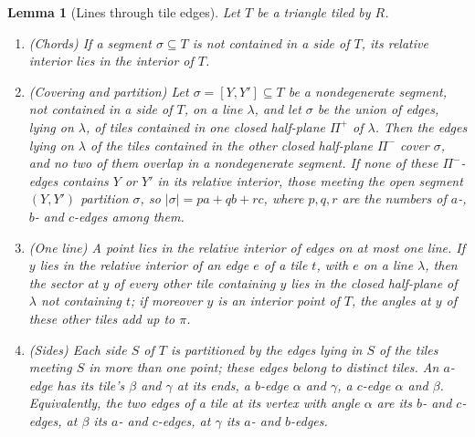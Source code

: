 \documentclass[11pt]{amsart}
\newtheorem{lemma}[theorem]{Lemma}
\theoremstyle{remark}
\begin{document}
\begin{lemma}[Lines through tile edges]\label{app:lines}
Let $T$ be a triangle tiled by $R$.
\begin{enumerate}
\item[(F0)] \textup{(Chords)} If a segment $\sigma\subseteq T$ is not contained in a side of $T$, its relative interior lies in the interior of $T$.
\item[(F1)] \textup{(Covering and partition)} Let $\sigma=[Y,Y']\subseteq T$ be a nondegenerate segment, not contained in a side of $T$, on a line $\lambda$, and let $\sigma$ be the union of edges, lying on $\lambda$, of tiles contained in one closed half-plane $\Pi^+$ of $\lambda$. Then the edges lying on $\lambda$ of the tiles contained in the other closed half-plane $\Pi^-$ cover $\sigma$, and no two of them overlap in a nondegenerate segment. If none of these $\Pi^-$-edges contains $Y$ or $Y'$ in its relative interior, those meeting the open segment $(Y,Y')$ partition $\sigma$, so $|\sigma|=pa+qb+rc$, where $p,q,r$ are the numbers of $a$-, $b$- and $c$-edges among them.
\item[(F2)] \textup{(One line)} A point lies in the relative interior of edges on at most one line. If $y$ lies in the relative interior of an edge $e$ of a tile $t$, with $e$ on a line $\lambda$, then the sector at $y$ of every other tile containing $y$ lies in the closed half-plane of $\lambda$ not containing $t$; if moreover $y$ is an interior point of $T$, the angles at $y$ of these other tiles add up to $\pi$.
\item[(F3)] \textup{(Sides)} Each side $S$ of $T$ is partitioned by the edges lying in $S$ of the tiles meeting $S$ in more than one point; these edges belong to distinct tiles. An $a$-edge has its tile's $\beta$ and $\gamma$ at its ends, a $b$-edge $\alpha$ and $\gamma$, a $c$-edge $\alpha$ and $\beta$. Equivalently, the two edges of a tile at its vertex with angle $\alpha$ are its $b$- and $c$-edges, at $\beta$ its $a$- and $c$-edges, at $\gamma$ its $a$- and $b$-edges.
\end{enumerate}
\end{lemma}
\end{document}
